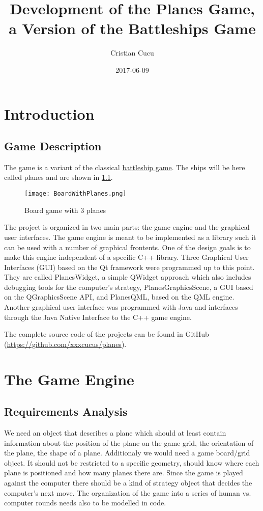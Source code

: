 \documentclass{report}
\title{Development of the Planes Game, a Version of the Battleships Game}
\date{2017-06-09}
\author{Cristian Cucu}
\begin{document}
\maketitle
\newpage
\lstset{language=C++}
\tableofcontents{}

\chapter{Introduction}

\section{Game Description}
The game is a variant of the classical \href{https://en.wikipedia.org/wiki/Battleship_(game)}{battleship game}. The ships will be here called planes and are shown in \ref{fig:board}.
\begin{figure}[h]
  \texttt{[image: BoardWithPlanes.png]}
  \caption{Board game with 3 planes}
  \label{fig:board}
\end{figure}
The project is organized in two main parts: the game engine and the graphical user interfaces. The game engine is meant to be implemented as a library such it can be used with a number of graphical frontents. One of the design goals is to make this engine independent of a specific C++ library. Three Graphical User Interfaces (GUI) based on the Qt framework were programmed up to this point. They are called PlanesWidget, a simple QWidget approach which also includes debugging tools for the computer's strategy, PlanesGraphicsScene, a GUI based on the QGraphicsScene API, and PlanesQML, based on the QML engine. Another graphical user interface was programmed with Java and interfaces through the Java Native Interface to the C++ game engine.

The complete source code of the projects can be found in GitHub (\url{https://github.com/xxxcucus/planes}).

\chapter {The Game Engine }
\section{Requirements Analysis}
We need an object that describes a plane which should at least contain information about the position of the plane on the game grid, the orientation of the plane, the shape of a plane. Additionaly we would need a game board/grid object. It should not be restricted to a specific geometry, should know where each plane is positioned and how many planes there are. Since the game is played against the computer there should be a kind of strategy object that decides the computer's next move. The organization of the game into a series of human vs. computer rounds needs also to be modelled in code.
\end{document}
